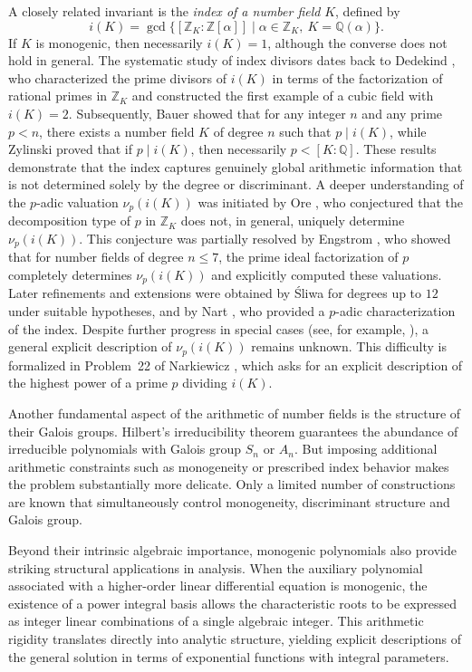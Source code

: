 \documentclass[table]{amsart}
\numberwithin{equation}{section}
\begin{document}
A closely related invariant is the \emph{index of a number field} $K$, defined by
\[
i(K)=\gcd\{[\mathbb{Z}_K:\mathbb{Z}[\alpha]] \mid \alpha\in\mathbb{Z}_K,\ K=\mathbb{Q}(\alpha)\}.
\]
If $K$ is monogenic, then necessarily $i(K)=1$, although the converse does not hold in general.
The systematic study of index divisors dates back to Dedekind \cite{RD1878}, who characterized the prime divisors of $i(K)$ in terms of the factorization of rational primes in $\mathbb{Z}_K$ and constructed the first example of a cubic field with $i(K)=2$.
Subsequently, Bauer \cite{Bauer1907} showed that for any integer $n$ and any prime $p<n$, there exists a number field $K$ of degree $n$ such that $p\mid i(K)$, while Zylinski \cite{Zylinski1913} proved that if $p\mid i(K)$, then necessarily $p<[K:\mathbb{Q}]$.
These results demonstrate that the index captures genuinely global arithmetic information that is not determined solely by the degree or discriminant.
A deeper understanding of the $p$-adic valuation $\nu_p(i(K))$ was initiated by Ore \cite{Ore1927}, who conjectured that the decomposition type of $p$ in $\mathbb{Z}_K$ does not, in general, uniquely determine $\nu_p(i(K))$.
This conjecture was partially resolved by Engstrom \cite{Engstrom1930}, who showed that for number fields of degree $n\le 7$, the prime ideal factorization of $p$ completely determines $\nu_p(i(K))$ and explicitly computed these valuations.
Later refinements and extensions were obtained by \'Sliwa \cite{Sliwa1982} for degrees up to $12$ under suitable hypotheses, and by Nart \cite{Nart1985}, who provided a $p$-adic characterization of the index.
Despite further progress in special cases (see, for example, \cite{GPP1991, Nak1983, PP2012, SW2003}), a general explicit description of $\nu_p(i(K))$ remains unknown.
This difficulty is formalized in Problem~22 of Narkiewicz \cite{Narkiewicz2004}, which asks for an explicit description of the highest power of a prime $p$ dividing $i(K)$.

Another fundamental aspect of the arithmetic of number fields is the structure of their Galois groups.
Hilbert’s irreducibility theorem guarantees the abundance of irreducible polynomials with Galois group $S_n$ or $A_n$. But imposing additional arithmetic constraints such as monogeneity or prescribed index behavior makes the problem substantially more delicate.
Only a limited number of constructions are known that simultaneously control monogeneity, discriminant structure and Galois group.

Beyond their intrinsic algebraic importance, monogenic polynomials also provide striking structural applications in analysis. When the auxiliary polynomial associated with a higher-order linear differential equation is monogenic, the existence of a power integral basis allows the characteristic roots to be expressed as integer linear combinations of a single algebraic integer. This arithmetic rigidity translates directly into analytic structure, yielding explicit descriptions of the general solution in terms of exponential functions with integral parameters.
\end{document}
